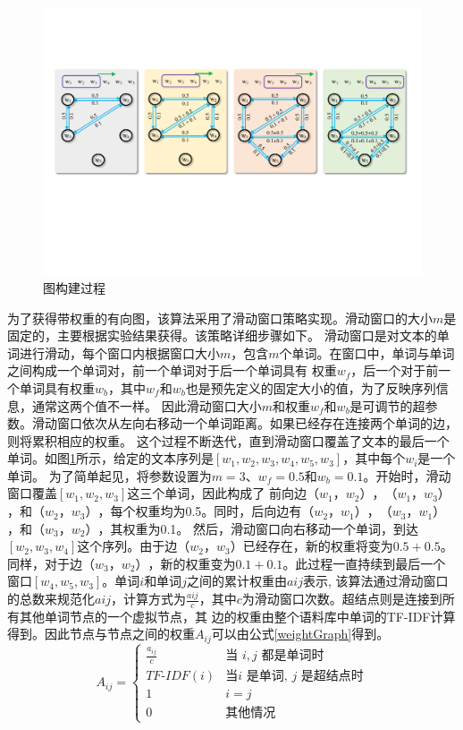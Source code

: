 \begin{figure}[htb]
    \setlength{\belowcaptionskip}{0pt}
    \centering
    \includegraphics[width=1\textwidth]{pic/text2graph.pdf}
    \caption{图构建过程}
    \label{text2graph}
\end{figure}

为了获得带权重的有向图，该算法采用了滑动窗口策略实现。滑动窗口的大小$m$是固定的，主要根据实验结果获得。该策略详细步骤如下。
滑动窗口是对文本的单词进行滑动，每个窗口内根据窗口大小$m$，包含$m$个单词。在窗口中，单词与单词之间构成一个单词对，前一个单词对于后一个单词具有
权重$w_f$，后一个对于前一个单词具有权重$w_b$，其中$w_f$和$w_b$也是预先定义的固定大小的值，为了反映序列信息，通常这两个值不一样。
因此滑动窗口大小$m$和权重$w_f$和$w_b$是可调节的超参数。滑动窗口依次从左向右移动一个单词距离。如果已经存在连接两个单词的边，则将累积相应的权重。
这个过程不断迭代，直到滑动窗口覆盖了文本的最后一个单词。如图\ref{text2graph}所示，给定的文本序列是$[w_1,w_2,w_3,w_4,w_5,w_3]$，其中每个$w_i$是一个单词。
为了简单起见，将参数设置为$m=3$、$w_f=0.5$和$w_b=0.1$。开始时，滑动窗口覆盖$[w_1,w_2,w_3]$这三个单词，因此构成了
前向边$（w_1，w_2）$，$（w_1，w_3）$，和$（w_2，w_3）$，每个权重均为0.5。同时，后向边有$（w_2，w_1）$，$（w_3，w_1）$，和$（w_3，w_2）$，其权重为0.1。
然后，滑动窗口向右移动一个单词，到达$[w_2,w_3,w_4]$这个序列。由于边$（w_2，w_3）$已经存在，新的权重将变为$0.5+0.5$。
同样，对于边$（w_3，w_2）$，新的权重变为$0.1+0.1$。此过程一直持续到最后一个窗口$[w_4,w_5,w_3]$。单词$i$和单词$j$之间的累计权重由$a{ij}$表示,
该算法通过滑动窗口的总数来规范化$a{ij}$，计算方式为$\frac{a{ij}}{c}$，其中$c$为滑动窗口次数。超结点则是连接到所有其他单词节点的一个虚拟节点，其
边的权重由整个语料库中单词的TF-IDF计算得到。因此节点与节点之间的权重$A_{ij}$可以由公式\ref{weightGraph}得到。
\begin{equation}\label{weightGraph}
A_{ij}=
\begin{cases}
\frac{a_{ij}}{c}& \text{当 $i, j$ 都是单词时}\\
TF\text{-}IDF(i) & \text{当$i$ 是单词, $j$ 是超结点时}\\
1 & \text{$i=j$}\\
0 & \text{其他情况}
\end{cases}
\end{equation}

